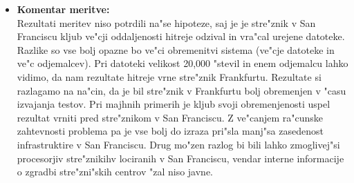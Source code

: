\begin{itemize}
	\item \textbf{Komentar meritve: } \\ 
		Rezultati meritev niso potrdili na"se hipoteze, saj je je stre"znik v San Franciscu kljub ve"cji oddaljenosti hitreje odzival in vra"cal urejene datoteke. 
		Razlike so vse bolj opazne bo ve"ci obremenitvi sistema (ve"cje datoteke in ve"c odjemalcev). Pri datoteki velikost 20,000 "stevil in enem odjemalcu lahko vidimo, da nam rezultate hitreje vrne stre"znik Frankfurtu. Rezultate si razlagamo na na"cin, da je bil stre"znik v Frankfurtu bolj obremenjen v "casu izvajanja testov. Pri majhnih primerih je kljub svoji obremenjenosti uspel rezultat vrniti pred stre"znikom v San Franciscu. Z ve"canjem ra"cunske zahtevnosti problema pa je vse bolj do izraza pri"sla manj"sa zasedenost infrastruktire v San Franciscu. Drug mo"zen razlog bi bili lahko zmoglivej"si procesorjiv stre"znikihv lociranih  v San Franciscu, vendar interne informacije o zgradbi stre"zni"skih centrov "zal niso javne.


\end{itemize}

